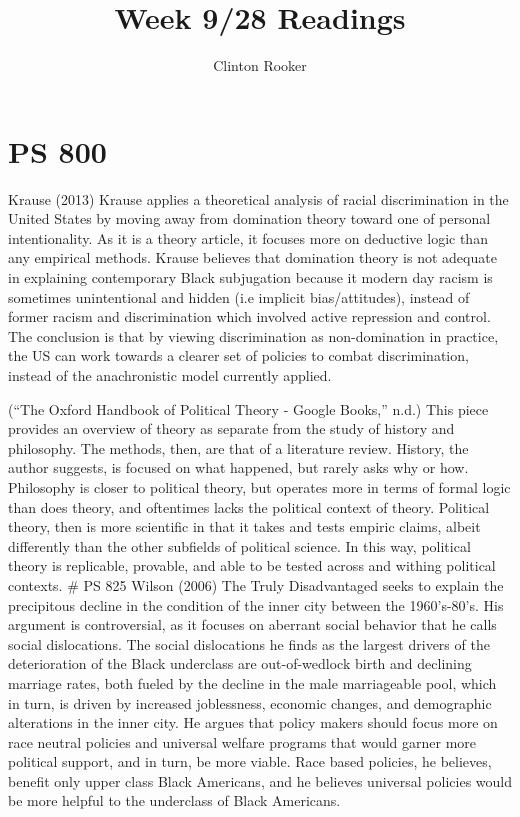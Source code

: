 \documentclass[
  english,
  man]{apa6}
\title{Week 9/28 Readings}
\author{Clinton Rooker\textsuperscript{}}
\date{}
\affiliation{\vspace{0.5cm}\textsuperscript{} University of Wisconsin - Madison\\\textsuperscript{} }
\begin{document}
\maketitle

\hypertarget{ps-800}{%
\section{PS 800}\label{ps-800}}

Krause (2013)
Krause applies a theoretical analysis of racial discrimination in the United
States by moving away from domination theory toward one of personal intentionality. As it is a theory article, it focuses more on deductive logic than any empirical methods. Krause believes that domination theory is not adequate in explaining contemporary Black subjugation because it modern day racism is sometimes unintentional and hidden (i.e implicit bias/attitudes), instead of former racism and discrimination which involved active repression and control. The conclusion is that by viewing discrimination as non-domination in practice, the US can work towards a clearer set of policies to combat discrimination, instead of the anachronistic model currently applied.

(``The Oxford Handbook of Political Theory - Google Books,'' n.d.)
This piece provides an overview of theory as separate from the study of history and philosophy. The methods, then, are that of a literature review. History, the author suggests, is focused on what happened, but rarely asks why or how. Philosophy is closer to political theory, but operates more in terms of formal logic than does theory, and oftentimes lacks the political context of theory. Political theory, then is more scientific in that it takes and tests empiric claims, albeit differently than the other subfields of political science. In this way, political theory is replicable, provable, and able to be tested across and withing political contexts.
\# PS 825
Wilson (2006)
The Truly Disadvantaged seeks to explain the precipitous decline in the condition
of the inner city between the 1960's-80's. His argument is controversial, as
it focuses on aberrant social behavior that he calls social dislocations.
The social dislocations he finds as the largest drivers of the deterioration
of the Black underclass are out-of-wedlock birth and declining marriage rates,
both fueled by the decline in the male marriageable pool, which in turn, is
driven by increased joblessness, economic changes, and demographic alterations in the inner city. He argues that policy makers should focus more on race neutral policies and universal welfare programs that would garner more political support, and in turn, be more viable. Race based policies, he believes, benefit only upper class Black Americans, and he believes universal policies would be more helpful to the underclass of Black Americans.
\end{document}
